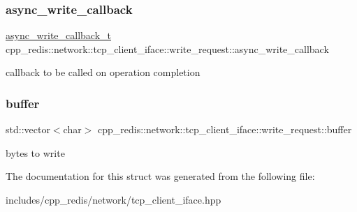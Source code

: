 \subsubsection{\texorpdfstring{async\+\_\+write\+\_\+callback}{async\_write\_callback}}
{\footnotesize\ttfamily \mbox{\hyperlink{classcpp__redis_1_1network_1_1tcp__client__iface_a1dc52ccc70cf377c4fbb495a16adc658}{async\+\_\+write\+\_\+callback\+\_\+t}} cpp\+\_\+redis\+::network\+::tcp\+\_\+client\+\_\+iface\+::write\+\_\+request\+::async\+\_\+write\+\_\+callback}

callback to be called on operation completion \mbox{\label{structcpp__redis_1_1network_1_1tcp__client__iface_1_1write__request_ad3567dac827f550b60491af530f0db2e}} 
\subsubsection{\texorpdfstring{buffer}{buffer}}
{\footnotesize\ttfamily std\+::vector$<$char$>$ cpp\+\_\+redis\+::network\+::tcp\+\_\+client\+\_\+iface\+::write\+\_\+request\+::buffer}

bytes to write 

The documentation for this struct was generated from the following file\+:\begin{DoxyCompactItemize}
\item 
includes/cpp\+\_\+redis/network/tcp\+\_\+client\+\_\+iface.\+hpp\end{DoxyCompactItemize}
